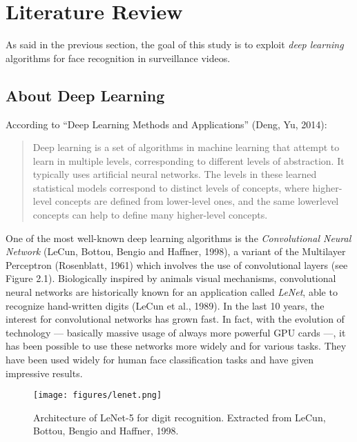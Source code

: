 \setlength{\footskip}{8mm}

\chapter{Literature Review} 
\protect\label{ch:literature-review}

As said in the previous section, the goal of this study is to exploit \textit{deep learning} algorithms for face recognition in surveillance videos.

\section{About Deep Learning}
\protect\label{Main-keywords-of-the-topic}
According to \enquote{Deep Learning Methods and Applications} (Deng, Yu, 2014):

\blockquote{Deep learning is a set of algorithms in machine
learning that attempt to learn in multiple levels, corresponding
to different levels of abstraction. It typically uses artificial
neural networks. The levels in these learned statistical models
correspond to distinct levels of concepts, where higher-level concepts
are defined from lower-level ones, and the same lowerlevel
concepts can help to define many higher-level concepts.}

One of the most well-known deep learning algorithms is the \textit{Convolutional Neural Network} (LeCun, Bottou, Bengio and Haffner, 1998), a variant of the Multilayer Perceptron (Rosenblatt, 1961) which involves the use of convolutional layers (see Figure 2.1). Biologically inspired by animals visual mechanisms, convolutional neural networks are historically known for an application called \textit{LeNet}, able to recognize hand-written digits (LeCun et al., 1989). In the last 10 years, the interest for convolutional networks has grown fast. In fact, with the evolution of technology --- basically massive usage of always more powerful GPU cards ---, it has been possible to use these networks more widely and for various tasks. They have been used widely for human face classification tasks and have given impressive results.

\begin{figure}[!ht]
  \centering
  \texttt{[image: figures/lenet.png]}  
  \caption[Architecture of LeNet-5 for digit recognition. Extracted from LeCun, Bottou, Bengio and Haffner, 1998.]{Architecture of LeNet-5 for digit recognition. Extracted from LeCun, Bottou, Bengio and Haffner, 1998.}
  \protect\label{fig:lenet}
\end{figure}

